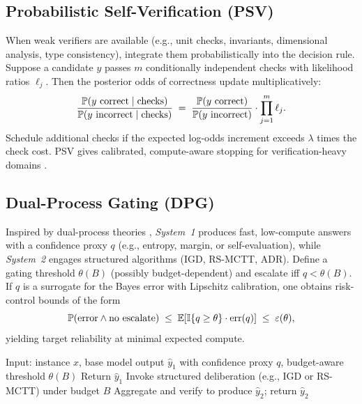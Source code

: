 \subsection{Probabilistic Self-Verification (PSV)}

When weak verifiers are available (e.g., unit checks, invariants, dimensional analysis, type consistency), integrate them probabilistically into the decision rule. Suppose a candidate $y$ passes $m$ conditionally independent checks with likelihood ratios $\ell_j$. Then the posterior odds of correctness update multiplicatively:
\begin{equation}
\frac{\mathbb{P}(y \text{ correct}\mid \text{checks})}{\mathbb{P}(y \text{ incorrect}\mid \text{checks})}
\;=\; 
\frac{\mathbb{P}(y \text{ correct})}{\mathbb{P}(y \text{ incorrect})}
\cdot \prod_{j=1}^m \ell_j.
\end{equation}
Schedule additional checks if the expected log-odds increment exceeds $\lambda$ times the check cost. PSV gives calibrated, compute-aware stopping for verification-heavy domains \cite{cobbe2021trainverify,lightman2023letsverify}.

\subsection{Dual-Process Gating (DPG)}

Inspired by dual-process theories \cite{kahneman2011,botvinick2019rlfastslow}, \emph{System~1} produces fast, low-compute answers with a confidence proxy $q$ (e.g., entropy, margin, or self-evaluation), while \emph{System~2} engages structured algorithms (IGD, RS-MCTT, ADR).
Define a gating threshold $\theta(B)$ (possibly budget-dependent) and escalate iff $q < \theta(B)$.
If $q$ is a surrogate for the Bayes error with Lipschitz calibration, one obtains risk-control bounds of the form
\[
\mathbb{P}(\text{error}\wedge \text{no escalate}) \;\le\; \mathbb{E}[\mathbb{I}\{q \ge \theta\} \cdot \mathrm{err}(q)] \;\le\; \varepsilon(\theta),
\]
yielding target reliability at minimal expected compute.

\begin{algorithm}[h]
\caption{Dual-Process Gating (DPG) for compute-aware escalation}
\label{alg:dpg}
\begin{algorithmic}[1]
\STATE Input: instance $x$, base model output $\hat{y}_1$ with confidence proxy $q$, budget-aware threshold $\theta(B)$
    \STATE Return $\hat{y}_1$ 
\ELSE
    \STATE Invoke structured deliberation (e.g., IGD or RS-MCTT) under budget $B$
    \STATE Aggregate and verify to produce $\hat{y}_2$; return $\hat{y}_2$
\ENDIF
\end{algorithmic}
\end{algorithm}

